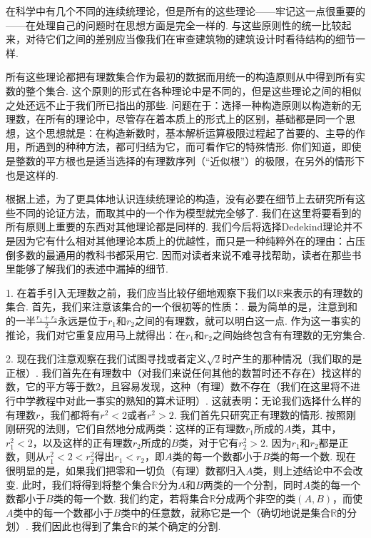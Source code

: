 \documentclass[color=cyan,mathpazo,titlestyle=hang]{elegantbook_mac}
\begin{document}
在科学中有几个不同的连续统理论，但是所有的这些理论——牢记这一点很重要的——在处理自己的问题时在思想方面是完全一样的. 与这些原则性的统一比较起来，对待它们之间的差别应当像我们在审查建筑物的建筑设计时看待结构的细节一样. 

所有这些理论都把有理数集合作为最初的数据而用统一的构造原则从中得到所有实数的整个集合. 这个原则的形式在各种理论中是不同的，但是这些理论之间的相似之处还远不止于我们所已指出的那些. 问题在于：选择一种构造原则以构造新的无理数，在所有的理论中，尽管存在着本质上的形式上的区别，基础都是同一个思想，这个思想就是：在构造新数时，基本解析运算极限过程起了首要的、主导的作用，所遇到的种种方法，都可归结为它，而可看作它的特殊情形. 你们知道，即使是整数的平方根也是适当选择的有理数序列（``近似根''）的极限，在另外的情形下也是这样的. 

根据上述，为了更具体地认识连续统理论的构造，没有必要在细节上去研究所有这些不同的论证方法，而取其中的一个作为模型就完全够了. 我们在这里将要看到的所有原则上重要的东西对其他理论都是同样的. 我们今后将选择Dedekind理论并不是因为它有什么相对其他理论本质上的优越性，而只是一种纯粹外在的理由：占压倒多数的最通用的教科书都采用它. 因而对读者来说不难寻找帮助，读者在那些书里能够了解我们的表述中漏掉的细节. 

1. 在着手引入无理数之前，我们应当比较仔细地观察下我们以$\mathbb{R}$来表示的有理数的集合. 首先，我们来注意该集合的一个很初等的性质：. 最为简单的是，注意到和的一半$\frac{r_1+r_2}{2}$永远是位于$r_1$和$r_2$之间的有理数，就可以明白这一点. 作为这一事实的推论，我们对它重复应用马上就得出：在$r_1$和$r_2$之间始终包含有有理数的无穷集合. 

2. 现在我们注意观察在我们试图寻找或者定义$\sqrt{2}$时产生的那种情况（我们取的是正根）. 我们首先在有理数中（对我们来说任何其他的数暂时还不存在）找这样的数，它的平方等于数$2$，且容易发现，这种（有理）数不存在（我们在这里将不进行中学教程中对此一事实的熟知的算术证明）. 这就表明：无论我们选择什么样的有理数$r$，我们都将有$r^2<2$或者$r^2>2$. 我们首先只研究正有理数的情形. 按照刚刚研究的法则，它们自然地分成两类：这样的正有理数$r_1$所成的$A$类，其中，$r_1^2<2$，以及这样的正有理数$r_2$所成的$B$类，对于它有$r_2^2>2$. 因为$r_1$和$r_2$都是正数，则从$r_1^2<2<r_2^2$得出$r_1<r_2$，即$A$类的每一个数都小于$B$类的每一个数. 现在很明显的是，如果我们把零和一切负（有理）数都归入$A$类，则上述结论中不会改变. 此时，我们将得到将整个集合$\mathbb{R}$分为$A$和$B$两类的一个分割，同时$A$类的每一个数都小于$B$类的每一个数. 我们约定，若将集合$\mathbb{R}$分成两个非空的类$(A,B)$，而使$A$类中的每一个数都小于$B$类中的任意数，就称它是一个（确切地说是集合$\mathbb{R}$的分划）. 我们因此也得到了集合$\mathbb{R}$的某个确定的分割. 
\end{document}
